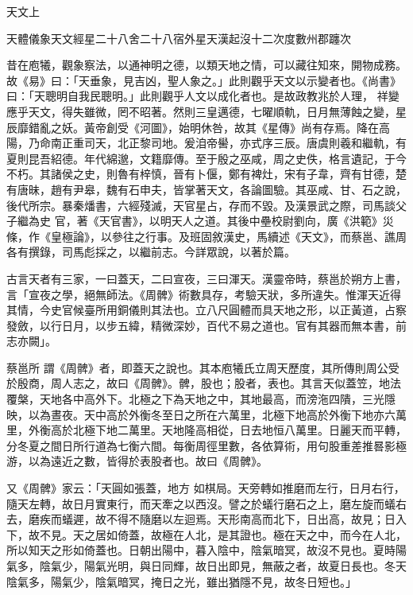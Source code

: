 
\begin{pinyinscope}

 天文上{{天體儀象天文經星二十八舍二十八宿外星天漢起沒十二次度數州郡躔次



 昔在庖犧，觀象察法，以通神明之德，以類天地之情，可以藏往知來，開物成務。故《易》曰：「天垂象，見吉凶，聖人象之。」此則觀乎天文以示變者也。《尚書》曰：「天聰明自我民聰明。」此則觀乎人文以成化者也。是故政教兆於人理，
 祥變應乎天文，得失雖微，罔不昭著。然則三皇邁德，七曜順軌，日月無薄蝕之變，星辰靡錯亂之妖。黃帝創受《河圖》，始明休咎，故其《星傳》尚有存焉。降在高陽，乃命南正重司天，北正黎司地。爰洎帝嚳，亦式序三辰。唐虞則羲和繼軌，有夏則昆吾紹德。年代綿邈，文籍靡傳。至于殷之巫咸，周之史佚，格言遺記，于今不朽。其諸侯之史，則魯有梓慎，晉有卜偃，鄭有裨灶，宋有子韋，齊有甘德，楚有唐昧，趙有尹皋，魏有石申夫，皆掌著天文，各論圖驗。其巫咸、甘、石之說，後代所宗。暴秦燔書，六經殘滅，天官星占，存而不毀。及漢景武之際，司馬談父子繼為史
 官，著《天官書》，以明天人之道。其後中壘校尉劉向，廣《洪範》災條，作《皇極論》，以參往之行事。及班固敘漢史，馬續述《天文》，而蔡邕、譙周各有撰錄，司馬彪採之，以繼前志。今詳眾說，以著於篇。



 古言天者有三家，一曰蓋天，二曰宣夜，三曰渾天。漢靈帝時，蔡邕於朔方上書，言「宣夜之學，絕無師法。《周髀》術數具存，考驗天狀，多所違失。惟渾天近得其情，今史官候臺所用銅儀則其法也。立八尺圓體而具天地之形，以正黃道，占察發斂，以行日月，以步五緯，精微深妙，百代不易之道也。官有其器而無本書，前志亦闕」。



 蔡邕所
 謂《周髀》者，即蓋天之說也。其本庖犧氏立周天歷度，其所傳則周公受於殷商，周人志之，故曰《周髀》。髀，股也；股者，表也。其言天似蓋笠，地法覆槃，天地各中高外下。北極之下為天地之中，其地最高，而滂沲四隤，三光隱映，以為晝夜。天中高於外衡冬至日之所在六萬里，北極下地高於外衡下地亦六萬里，外衡高於北極下地二萬里。天地隆高相從，日去地恒八萬里。日麗天而平轉，分冬夏之間日所行道為七衡六間。每衡周徑里數，各依算術，用句股重差推晷影極游，以為遠近之數，皆得於表股者也。故曰《周髀》。



 又《周髀》家云：「天圓如張蓋，地方
 如棋局。天旁轉如推磨而左行，日月右行，隨天左轉，故日月實東行，而天牽之以西沒。譬之於蟻行磨石之上，磨左旋而蟻右去，磨疾而蟻遲，故不得不隨磨以左迴焉。天形南高而北下，日出高，故見；日入下，故不見。天之居如倚蓋，故極在人北，是其證也。極在天之中，而今在人北，所以知天之形如倚蓋也。日朝出陽中，暮入陰中，陰氣暗冥，故沒不見也。夏時陽氣多，陰氣少，陽氣光明，與日同輝，故日出即見，無蔽之者，故夏日長也。冬天陰氣多，陽氣少，陰氣暗冥，掩日之光，雖出猶隱不見，故冬日短也。」



}}
\end{pinyinscope}
